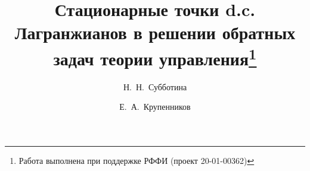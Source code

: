

\usepackage{todonotes} %

\usepackage[russian]{nla}

%
%


%




%


\fi


\title{Стационарные точки d.c. Лагранжианов в решении обратных задач теории управления\thanks{Работа выполнена при поддержке РФФИ (проект 20-01-00362)}}
\author{Н.~Н.~Субботина   %
  \and  %
  Е.~А.~Крупенников
  \and
} %


\maketitle

